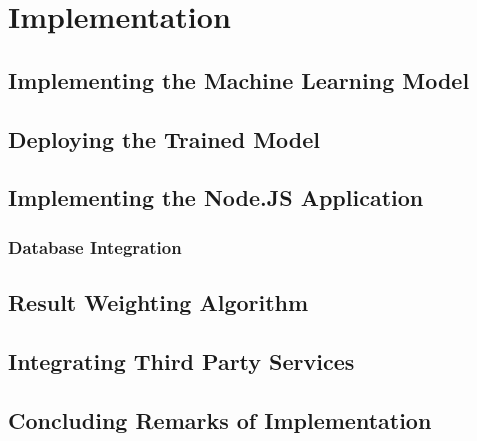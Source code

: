 \chapter{Implementation}


\section{Implementing the Machine Learning Model}

\section{Deploying the Trained Model}

\section{Implementing the Node.JS Application}
\subsection{Database Integration}

\section{Result Weighting Algorithm}

\section{Integrating Third Party Services}

\section{Concluding Remarks of Implementation}
